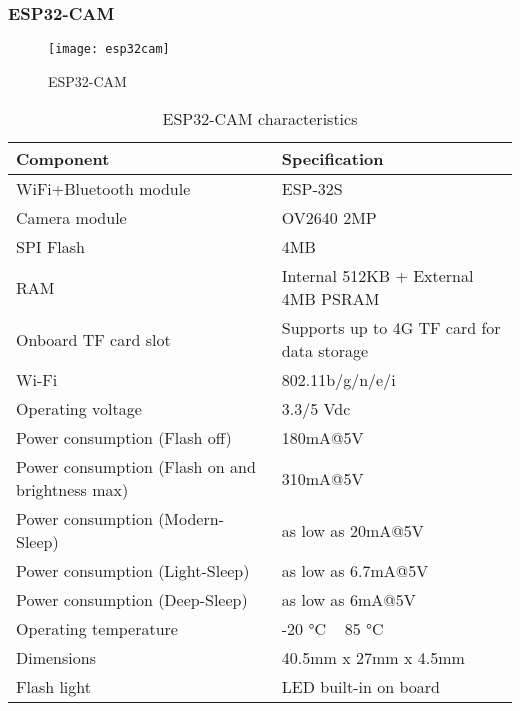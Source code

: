 \subsubsection{ESP32-CAM}
\FloatBarrier
\begin{figure}[h]
         \centering
        \texttt{[image: esp32cam]}
   
        \caption{ESP32-CAM}
        \label{fig:esp32cam}
    \end{figure}
\FloatBarrier
\FloatBarrier
\begin{table}[h]
\centering
\begin{tabular}{|l|l|}
\hline
\textbf{Component} & \textbf{Specification} \\ \hline
WiFi+Bluetooth module & ESP-32S \\ \hline
Camera module & OV2640 2MP \\ \hline
SPI Flash & 4MB \\ \hline
RAM & Internal 512KB + External 4MB PSRAM \\ \hline
Onboard TF card slot & Supports up to 4G TF card for data storage \\ \hline
Wi-Fi & 802.11b/g/n/e/i \\ \hline
Operating voltage & 3.3/5 Vdc \\ \hline
Power consumption (Flash off) & 180mA@5V \\ \hline
Power consumption (Flash on and brightness max) & 310mA@5V \\ \hline
Power consumption (Modern-Sleep) & as low as 20mA@5V \\ \hline
Power consumption (Light-Sleep) & as low as 6.7mA@5V \\ \hline
Power consumption (Deep-Sleep) & as low as 6mA@5V \\ \hline
Operating temperature & -20 °C ~ 85 °C \\ \hline
Dimensions & 40.5mm x 27mm x 4.5mm \\ \hline
Flash light & LED built-in on board \\ \hline
\end{tabular}
\caption{ESP32-CAM characteristics \cite{HT}}
\label{table:esp32-cam-characteristics}
\end{table}
\FloatBarrier
